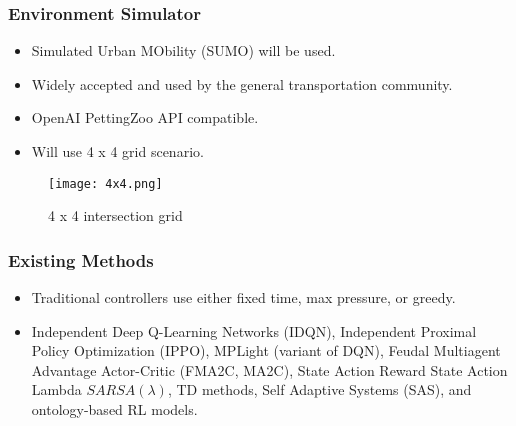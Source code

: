 \documentclass[compress,12pt]{beamer}
\begin{document}
\begin{frame}[bg=arguelles.png]
      \frametitle{Environment Simulator}
      \begin{itemize}
      \item Simulated Urban MObility (SUMO) will be used\cite{sumorl}.
      \item Widely accepted and used by the general transportation community\cite{ault2021reinforcement}.
      \item OpenAI PettingZoo API compatible\cite{terry2021pettingzoo}.
      \item Will use 4 x 4 grid scenario.
      \end{itemize}

    \begin{figure}[htbp]
      \centering
      \texttt{[image: 4x4.png]}
      \caption{4 x 4 intersection grid\cite{DBLP:journals/corr/abs-2004-04778}}
      \label{fig:intersection_grid}
    \end{figure}

\end{frame}

\begin{frame}[bg=logo.png]
\end{frame}


\begin{frame}[bg=arguelles.png]
      \frametitle{Existing Methods}
      \begin{itemize}
      \item Traditional controllers use either fixed time, max pressure, or greedy\cite{ault2021reinforcement}\cite{Chen_Wei_Xu_Zheng_Yang_Xiong_Xu_Li_2020}.
      \item Independent Deep Q-Learning Networks (IDQN), Independent Proximal Policy Optimization (IPPO), MPLight (variant of DQN)\cite{Chen_Wei_Xu_Zheng_Yang_Xiong_Xu_Li_2020}, Feudal Multiagent Advantage Actor-Critic (FMA2C, MA2C)\cite{DBLP:journals/corr/abs-1903-04527}, State Action Reward State Action Lambda \(SARSA(\lambda)\), TD methods\cite{Reza2023}, Self Adaptive Systems (SAS), and ontology-based RL models\cite{Ghanadbashi2023}.
      \end{itemize}

\end{frame}
\end{document}
